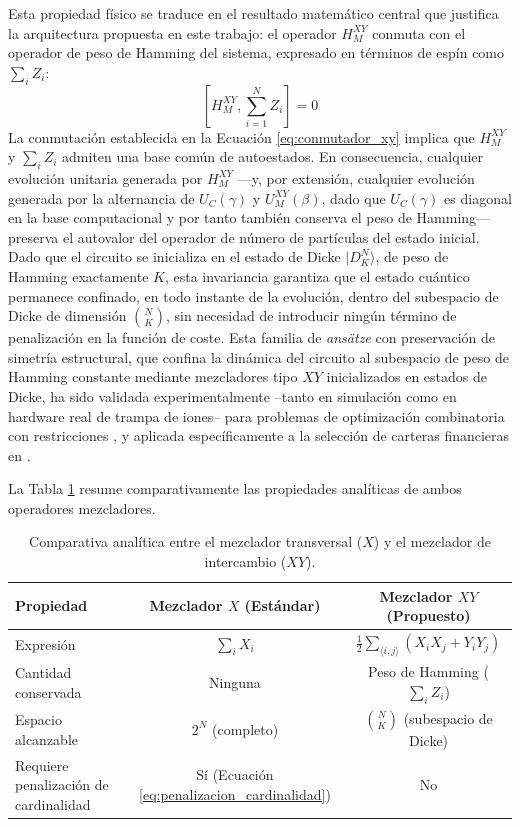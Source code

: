 Esta propiedad físico se traduce en el resultado matemático central que justifica la arquitectura propuesta en este trabajo: el operador $H_M^{XY}$ conmuta con el operador de peso de Hamming del sistema, expresado en términos de espín como $\sum_i Z_i$:
\begin{equation}
    \left[ H_{M}^{XY}, \sum_{i=1}^N Z_i \right] = 0
    \label{eq:conmutador_xy}
\end{equation}
La conmutación establecida en la Ecuación \eqref{eq:conmutador_xy} implica que $H_M^{XY}$ y $\sum_i Z_i$ admiten una base común de autoestados. En consecuencia, cualquier evolución unitaria generada por $H_M^{XY}$ —y, por extensión, cualquier evolución generada por la alternancia de $U_C(\gamma)$ y $U_M^{XY}(\beta)$, dado que $U_C(\gamma)$ es diagonal en la base computacional y por tanto también conserva el peso de Hamming— preserva el autovalor del operador de número de partículas del estado inicial. Dado que el circuito se inicializa en el estado de Dicke $|D_K^N\rangle$, de peso de Hamming exactamente $K$, esta invariancia garantiza que el estado cuántico permanece confinado, en todo instante de la evolución, dentro del subespacio de Dicke de dimensión $\binom{N}{K}$, sin necesidad de introducir ningún término de penalización en la función de coste. Esta familia de \textit{ansätze} con preservación de simetría estructural, que confina la dinámica del circuito al subespacio de peso de Hamming constante mediante mezcladores tipo $XY$ inicializados en estados de Dicke, ha sido validada experimentalmente --tanto en simulación como en hardware real de trampa de iones-- para problemas de optimización combinatoria con restricciones \cite{He2023,Niroula2022}, y aplicada específicamente a la selección de carteras financieras en \cite{Mancilla2026}.

La Tabla \ref{tab:comparativa_mixers} resume comparativamente las propiedades analíticas de ambos operadores mezcladores.

\begin{table}[htbp]
    \centering
    \caption{Comparativa analítica entre el mezclador transversal ($X$) y el mezclador de intercambio ($XY$).}
    \label{tab:comparativa_mixers}
    \begin{tabular}{lcc}
        \toprule
        \textbf{Propiedad} & \textbf{Mezclador $X$ (Estándar)} & \textbf{Mezclador $XY$ (Propuesto)} \\
        \midrule
        Expresión & $\sum_i X_i$ & $\frac{1}{2}\sum_{\langle i,j\rangle}(X_iX_j + Y_iY_j)$ \\
        Cantidad conservada & Ninguna & Peso de Hamming ($\sum_i Z_i$) \\
        Espacio alcanzable & $2^N$ (completo) & $\binom{N}{K}$ (subespacio de Dicke) \\
        Requiere penalización de cardinalidad & Sí (Ecuación \ref{eq:penalizacion_cardinalidad}) & No \\
        \bottomrule
    \end{tabular}
\end{table}

